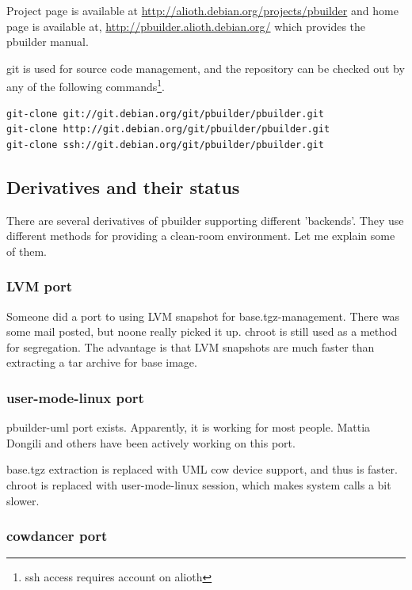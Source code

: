 \documentclass[a4paper]{article}
\begin{document}
Project page is available at 
\url{http://alioth.debian.org/projects/pbuilder}
and home page is available at, 
\url{http://pbuilder.alioth.debian.org/}
which provides the pbuilder manual.

git is used for source code management, and the repository can be
checked out by any of the following commands\footnote{ssh access
requires account on alioth}.

\begin{verbatim}
git-clone git://git.debian.org/git/pbuilder/pbuilder.git
git-clone http://git.debian.org/git/pbuilder/pbuilder.git
git-clone ssh://git.debian.org/git/pbuilder/pbuilder.git
\end{verbatim}

\subsection{Derivatives and their status}

There are several derivatives of pbuilder supporting different
'backends'. They use different methods for providing a clean-room
environment.
Let me explain some of them.

\subsubsection{LVM port}

Someone did a port to using LVM snapshot for base.tgz-management.  There
was some mail posted, but noone really picked it up.  chroot is still
used as a method for segregation. The advantage is that LVM snapshots
are much faster than extracting a tar archive for base image.

\subsubsection{user-mode-linux port}

pbuilder-uml port exists. Apparently, it is working for most people.
Mattia Dongili and others have been actively working on this port.

base.tgz extraction is replaced with UML cow device support, and thus is
faster. chroot is replaced with user-mode-linux session, which makes
system calls a bit slower.

\subsubsection{cowdancer port}
\end{document}
